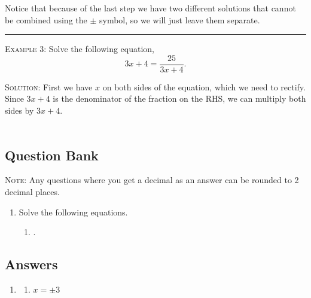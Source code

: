\documentclass[a4paper,12pt]{article}
\begin{document}
Notice that because of the last step we have two different
solutions that cannot be combined using the $\pm$ symbol, so
we will just leave them separate.

\vspace{3mm}
\hrule
\vspace{3mm}

\textsc{Example 3}: Solve the following equation,
$$3x + 4 = \frac{25}{3x + 4}.$$

\textsc{Solution}: First we have $x$ on both sides of the 
equation, which we need to rectify. Since $3x+4$ is the 
denominator of the fraction on the RHS, we can multiply both
sides by $3x+4$.

\begin{align*}
\end{align*}

\newpage
\subsection*{Question Bank}

\textsc{Note}: Any questions where you get a decimal as an answer
can be rounded to 2 decimal places.

\begin{enumerate}
\item Solve the following equations.
    \begin{multicols}{2}
    \begin{enumerate}
    \item .
    \end{enumerate}
    \end{multicols}


\end{enumerate}

\newpage
\subsection*{Answers}

\begin{enumerate}
\item 
    \begin{multicols}{2}
    \begin{enumerate}
    \item $x = \pm 3$
    \end{enumerate}
    \end{multicols}

\end{enumerate}
\end{document}
